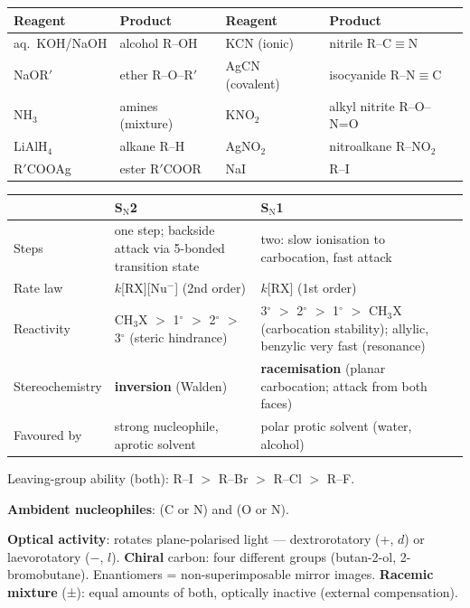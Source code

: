 \documentclass[9pt,a4paper]{extarticle}
\begin{document}
\begin{multicols}{2}
{\scriptsize\setlength{\tabcolsep}{2pt}
\begin{tabularx}{\linewidth}{@{}l Y l Y@{}}
\toprule
\textbf{Reagent} & \textbf{Product} & \textbf{Reagent} & \textbf{Product}\\
\midrule
aq.\ KOH/NaOH & alcohol R--OH & KCN (ionic) & nitrile R--C$\equiv$N\\
NaOR$'$ & ether R--O--R$'$ & AgCN (covalent) & isocyanide R--N$\equiv$C\\
NH$_3$ & amines (mixture) & KNO$_2$ & alkyl nitrite R--O--N=O\\
LiAlH$_4$ & alkane R--H & AgNO$_2$ & nitroalkane R--NO$_2$\\
R$'$COOAg & ester R$'$COOR & NaI & R--I\\
\bottomrule
\end{tabularx}\par}
\vspace{1pt}
{\scriptsize\setlength{\tabcolsep}{2pt}
\begin{tabularx}{\linewidth}{@{}l Y Y@{}}
\toprule
 & \textbf{S$_\text{N}$2} & \textbf{S$_\text{N}$1}\\
\midrule
Steps & one step; backside attack via 5-bonded transition state & two: slow ionisation to carbocation, fast attack\\
Rate law & $k$[RX][Nu$^-$] (2nd order) & $k$[RX] (1st order)\\
Reactivity & CH$_3$X $>$ 1$^\circ$ $>$ 2$^\circ$ $>$ 3$^\circ$ (steric hindrance) & 3$^\circ$ $>$ 2$^\circ$ $>$ 1$^\circ$ $>$ CH$_3$X (carbocation stability); allylic, benzylic very fast (resonance)\\
Stereochemistry & \textbf{inversion} (Walden) & \textbf{racemisation} (planar carbocation; attack from both faces)\\
Favoured by & strong nucleophile, aprotic solvent & polar protic solvent (water, alcohol)\\
\bottomrule
\end{tabularx}\par}
\begin{fl}
\item Leaving-group ability (both): R--I $>$ R--Br $>$ R--Cl $>$ R--F.
\item \textbf{Ambident nucleophiles}:  (C or N) and  (O or N).
\item \textbf{Optical activity}: rotates plane-polarised light — dextrorotatory (+, $d$) or laevorotatory ($-$, $l$). \textbf{Chiral} carbon: four different groups (butan-2-ol, 2-bromobutane). Enantiomers = non-superimposable mirror images. \textbf{Racemic mixture} (±): equal amounts of both, optically inactive (external compensation).

\end{fl}
\end{multicols}
\end{document}
